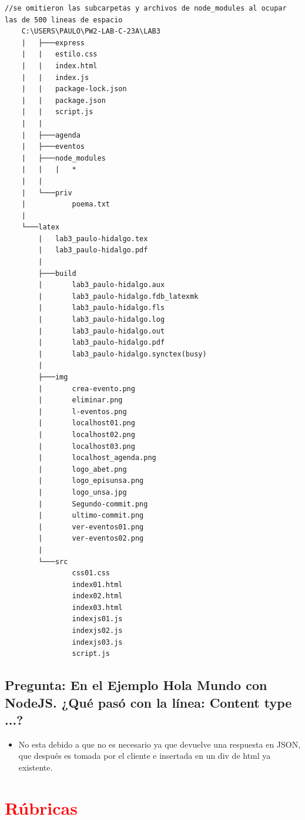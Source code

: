 \documentclass{article}
\begin{document}
\begin{lstlisting}[style=ascii-tree]
	//se omitieron las subcarpetas y archivos de node_modules al ocupar las de 500 lineas de espacio
	C:\USERS\PAULO\PW2-LAB-C-23A\LAB3
	|	├───express
	|   |   estilo.css
	|   |   index.html
	|   |   index.js
	|   |   package-lock.json
	|   |   package.json
	|   |   script.js
	|   |   
	|   ├───agenda
	|   ├───eventos
	|   ├───node_modules
	|   |   |   *
	|   |
	|   └───priv
	|           poema.txt
	|
	└───latex
		|   lab3_paulo-hidalgo.tex
		|	lab3_paulo-hidalgo.pdf
		|
		├───build
		|       lab3_paulo-hidalgo.aux
		|       lab3_paulo-hidalgo.fdb_latexmk
		|       lab3_paulo-hidalgo.fls
		|       lab3_paulo-hidalgo.log
		|       lab3_paulo-hidalgo.out
		|       lab3_paulo-hidalgo.pdf
		|       lab3_paulo-hidalgo.synctex(busy)
		|
		├───img
		|       crea-evento.png
		|       eliminar.png
		|       l-eventos.png
		|       localhost01.png
		|       localhost02.png
		|       localhost03.png
		|       localhost_agenda.png
		|       logo_abet.png
		|       logo_episunsa.png
		|       logo_unsa.jpg
		|       Segundo-commit.png
		|       ultimo-commit.png
		|       ver-eventos01.png
		|       ver-eventos02.png
		|
		└───src
				css01.css
				index01.html
				index02.html
				index03.html
				indexjs01.js
				indexjs02.js
				indexjs03.js
				script.js
\end{lstlisting}
\subsection{Pregunta: En el Ejemplo Hola Mundo con NodeJS. ¿Qué pasó con la línea: Content type ...?}
\begin{itemize}
	\item No esta debido a que no es necesario ya que devuelve una respuesta en JSON, que después
	es tomada por el cliente e insertada en un div de html ya existente.
\end{itemize}
	\clearpage
	\section{\textcolor{red}{Rúbricas}}
\end{document}
